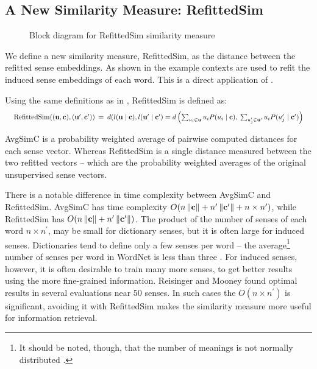 {\subsection{A New Similarity Measure: RefittedSim}\label{RefittedSimVsAvgSimC}
\begin{figure}
	\caption{Block diagram for RefittedSim similarity measure} \label{diaRefittedSim}
	\centering
	\begin{adjustbox}{max width=0.7\linewidth}
	
	\end{adjustbox}
\end{figure}
We define a new similarity measure, RefittedSim, as the distance between the refitted sense embeddings.
As shown in  the example contexts are used to refit the induced sense embeddings of each word.
This is a direct application of  .

Using the same definitions as in , RefittedSim is defined as:
\begin{equation} \label{eq:refittedsim}
\resizebox{\linewidth}{!}{
	$\mathrm{RefittedSim}((\u,\c),(\u^{\prime},\c^{\prime}))
	\:=\: d(l(\u \mid \c), l(\u^\prime \mid \c^\prime)
	= d\left(
	\sum_{u_{i}\in\u}u_{i}P(u_{i}\mid\c),\:
	\sum_{u_{j}^{\prime}\in\u^{\prime}}u_{i}P(u_{j}^{\prime}\mid\c^{\prime})\right)
	$
}
\end{equation}

AvgSimC is a probability weighted average of pairwise computed distances for each sense vector.
Whereas RefittedSim is a single distance measured between the two refitted vectors -- which are the probability weighted averages of the original unsupervised sense vectors.


There is a notable difference in time complexity between AvgSimC and RefittedSim.
AvgSimC has time complexity $O(n\left\Vert \mathbf{c}\right\Vert +n^{\prime}\left\Vert \mathbf{c}^{\prime}\right\Vert +n\times n^{\prime})$,
while RefittedSim has $O(n\left\Vert \mathbf{c}\right\Vert +n^{\prime}\left\Vert \mathbf{c}^{\prime}\right\Vert)$.
The product of the number of senses of each word $n \times n^\prime$, may be small for dictionary senses, but it is often large for induced senses. Dictionaries tend to define only a few senses per word -- the average\footnote{It should be noted, though, that the number of meanings is not normally distributed \parencite{zipf1945meaning}.} number of senses per word in WordNet is less than three \parencite{miller1995wordnet}.
For induced senses, however, it is often desirable to train many more senses, to get better results using the more fine-grained information.
Reisinger and Mooney \parencite{Reisinger2010} found optimal results in several evaluations near 50 senses.
In such cases the $O(n \times n^\prime)$ is significant, avoiding it with RefittedSim makes the similarity measure more useful for information retrieval.

}
